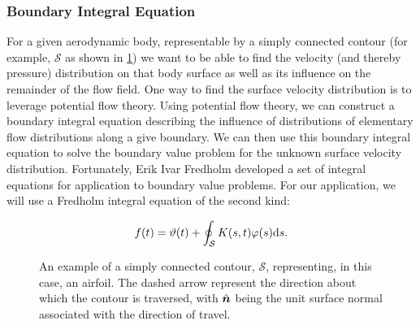 \subsubsection{Boundary Integral Equation}

For a given aerodynamic body, representable by a simply connected contour (for example, \(\mathcal{S}\) as shown in \cref{fig:simplyconnectedairfoil}) we want to be able to find the velocity (and thereby pressure) distribution on that body surface as well as its influence on the remainder of the flow field.
%
One way to find the surface velocity distribution is to leverage potential flow theory.
%
Using potential flow theory, we can construct a boundary integral equation describing the influence of distributions of elementary flow distributions along a give boundary.
%
We can then use this boundary integral equation to solve the boundary value problem for the unknown surface velocity distribution.
%
Fortunately, Erik Ivar Fredholm developed a set of integral equations for application to boundary value problems.
%
For our application, we will use a Fredholm integral equation of the second kind:

\begin{equation}
    \label{eqn:fredholm1}
    f(t) = \vartheta(t) + \oint_\mathcal{S} K(s,t) \varphi(s) \mathrm{d} s.
\end{equation}

\begin{figure}[h!]
    \centering
        
        \caption{An example of a simply connected contour, \(\mathcal{S}\), representing, in this case, an airfoil. The dashed arrow represent the direction about which the contour is traversed, with \(\hat{\bm{n}}\) being the unit surface normal associated with the direction of travel.}
    \label{fig:simplyconnectedairfoil}
\end{figure}




